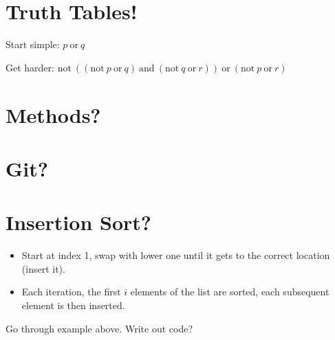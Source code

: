 \documentclass[12pt]{article}
\begin{document}
\section*{Truth Tables!}

Start simple: \(p\ \text{or}\ q\)

\noindent
Get harder: \(\text{not}\ ((\text{not}\ p\ \text{or}\ q)\ \text{and}\
(\text{not}\ q\ \text{or}\ r))\ \text{or}\ (\text{not}\ p\ \text{or}\ r)\)

\section*{Methods?}

\section*{Git?}

\section*{Insertion Sort?}

\begin{itemize}
   \item Start at index 1, swap with lower one until it gets to the correct
      location (insert it).
   \item Each iteration, the first \(i\) elements of the list are sorted, each
      subsequent element is then inserted.
\end{itemize}

Go through example above.  Write out code?


\end{document}
